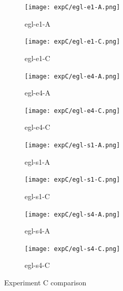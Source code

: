 \documentclass[twoside]{ctuthesis}
\theoremstyle{plain}
\theoremstyle{definition}
\theoremstyle{note}
\begin{document}
\begin{figure}[htbp]
	\centering
	
	\begin{subfigure}{0.45\textwidth}
		\texttt{[image: expC/egl-e1-A.png]}
		\caption{egl-e1-A}
		\label{fig:expC-e1-A}
	\end{subfigure}
	\hfill
	\begin{subfigure}{0.45\textwidth}
		\texttt{[image: expC/egl-e1-C.png]}
		\caption{egl-e1-C}
		\label{fig:expC-e1-C}
	\end{subfigure}
	
	\begin{subfigure}{0.45\textwidth}
		\texttt{[image: expC/egl-e4-A.png]}
		\caption{egl-e4-A}
		\label{fig:expC-e4-A}
	\end{subfigure}
	\hfill
	\begin{subfigure}{0.45\textwidth}
		\texttt{[image: expC/egl-e4-C.png]}
		\caption{egl-e4-C}
		\label{fig:expC-e4-C}
	\end{subfigure}
	
	\begin{subfigure}{0.45\textwidth}
		\texttt{[image: expC/egl-s1-A.png]}
		\caption{egl-s1-A}
		\label{fig:expC-s1-A}
	\end{subfigure}
	\hfill
	\begin{subfigure}{0.45\textwidth}
		\texttt{[image: expC/egl-s1-C.png]}
		\caption{egl-s1-C}
		\label{fig:expC-s1-C}
	\end{subfigure}
	
	\begin{subfigure}{0.45\textwidth}
		\texttt{[image: expC/egl-s4-A.png]}
		\caption{egl-s4-A}
		\label{fig:expC-s4-A}
	\end{subfigure}
	\hfill
	\begin{subfigure}{0.45\textwidth}
		\texttt{[image: expC/egl-s4-C.png]}
		\caption{egl-s4-C}
		\label{fig:expC-s4-C}
	\end{subfigure}
	
	\caption{Experiment C comparison}
	\label{fig:expC-comparison}
\end{figure}
\end{document}
